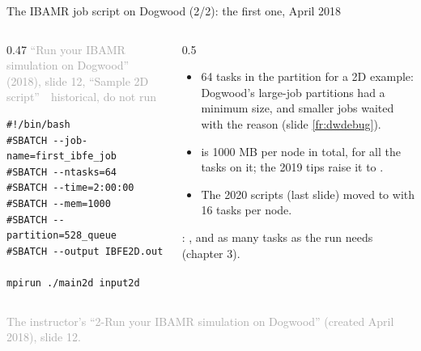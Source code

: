\documentclass[aspectratio=169,11pt]{beamer}
\newcommand{\sourcecredit}[1]{\vfill\begin{flushright}\tiny\textcolor{DarkGray}{#1}\end{flushright}}
\newcommand{\hist}[1]{{\tiny\sffamily\textcolor{DarkGray}{#1\ \textbullet\ historical, do not run}}\par\nointerlineskip\vspace{0.3mm}}
\begin{document}
\begin{frame}[fragile]{The IBAMR job script on Dogwood (2/2): the first one, April 2018}
\label{fr:dwjob2018}
\begin{columns}[T,onlytextwidth]
\begin{column}{0.47\textwidth}
\hist{``Run your IBAMR simulation on Dogwood'' (2018), slide 12, ``Sample 2D script''}
\begin{lstlisting}[style=hist]
#!/bin/bash
#SBATCH --job-name=first_ibfe_job
#SBATCH --ntasks=64
#SBATCH --time=2:00:00
#SBATCH --mem=1000
#SBATCH --partition=528_queue
#SBATCH --output IBFE2D.out

mpirun ./main2d input2d
\end{lstlisting}
\end{column}
\begin{column}{0.5\textwidth}
\footnotesize
\begin{itemize}\setlength{\itemsep}{2pt}
  \item 64 tasks in the  partition for a 2D example: Dogwood's large-job partitions had a minimum size, and smaller jobs waited with the reason  (slide \ref{fr:dwdebug}).
  \item {} is 1000 MB per node in total, for all the tasks on it; the 2019 tips raise it to .
  \item The 2020 scripts (last slide) moved to  with 16 tasks per node.
\end{itemize}
\vspace{1mm}
: , and as many tasks as the run needs (chapter 3).
\end{column}
\end{columns}
\sourcecredit{The instructor's ``2-Run your IBAMR simulation on Dogwood'' (created April 2018), slide 12.}
\end{frame}
\end{document}
